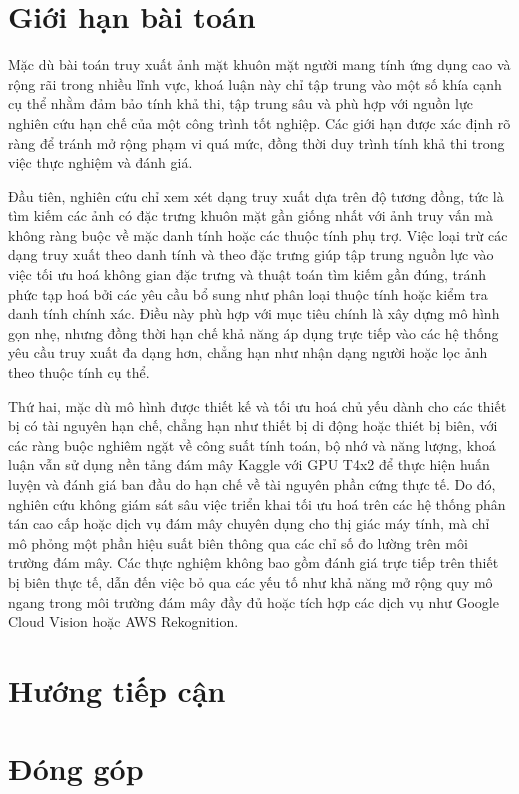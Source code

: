 \section{Giới hạn bài toán}
Mặc dù bài toán truy xuất ảnh mặt khuôn mặt người mang tính ứng dụng cao và rộng rãi trong nhiều lĩnh vực, khoá luận này chỉ tập trung vào một số khía cạnh cụ thể nhằm đảm bảo tính khả thi, tập trung sâu và phù hợp với nguồn lực nghiên cứu hạn chế của một công trình tốt nghiệp. Các giới hạn được xác định rõ ràng để tránh mở rộng phạm vi quá mức, đồng thời duy trình tính khả thi trong việc thực nghiệm và đánh giá.

Đầu tiên, nghiên cứu chỉ xem xét dạng truy xuất dựa trên độ tương đồng, tức là tìm kiếm các ảnh có đặc trưng khuôn mặt gần giống nhất với ảnh truy vấn mà không ràng buộc về mặc danh tính hoặc các thuộc tính phụ trợ. Việc loại trừ các dạng truy xuất theo danh tính và theo đặc trưng giúp tập trung nguồn lực vào việc tối ưu hoá không gian đặc trưng và thuật toán tìm kiếm gần đúng, tránh phức tạp hoá bởi các yêu cầu bổ sung như phân loại thuộc tính hoặc kiểm tra danh tính chính xác. Điều này phù hợp với mục tiêu chính là xây dựng mô hình gọn nhẹ, nhưng đồng thời hạn chế khả năng áp dụng trực tiếp vào các hệ thống yêu cầu truy xuất đa dạng hơn, chẳng hạn như nhận dạng người hoặc lọc ảnh theo thuộc tính cụ thể. 

Thứ hai, mặc dù mô hình được thiết kế và tối ưu hoá chủ yếu dành cho các thiết bị có tài nguyên hạn chế, chẳng hạn như thiết bị di động hoặc thiét bị biên, với các ràng buộc nghiêm ngặt về công suất tính toán, bộ nhớ và năng lượng, khoá luận vẫn sử dụng nền tảng đám mây Kaggle với GPU T4x2 để thực hiện huấn luyện và đánh giá ban đầu do hạn chế về tài nguyên phần cứng thực tế. Do đó, nghiên cứu không giám sát sâu việc triển khai tối ưu hoá trên các hệ thống phân tán cao cấp hoặc dịch vụ đám mây chuyên dụng cho thị giác máy tính, mà chỉ mô phỏng một phần hiệu suất biên thông qua các chỉ số đo lường trên môi trường đám mây. Các thực nghiệm không bao gồm đánh giá trực tiếp trên thiết bị biên thực tế, dẫn đến việc bỏ qua các yếu tố như khả năng mở rộng quy mô ngang trong môi trường đám mây đầy đủ hoặc tích hợp các dịch vụ như Google Cloud Vision hoặc AWS Rekognition.



\section{Hướng tiếp cận}
\section{Đóng góp}
